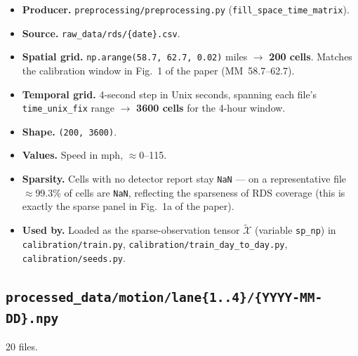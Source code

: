 \documentclass[11pt]{article}
\newcommand{\code}[1]{\texttt{#1}}
\newcommand{\nan}{\code{NaN}}
\newcommand{\filename}[1]{\textcolor{accent}{\code{#1}}}
\begin{document}
\begin{itemize}[leftmargin=*]
  \item \textbf{Producer.} \filename{preprocessing/preprocessing.py} (\code{fill\_space\_time\_matrix}).
  \item \textbf{Source.} \filename{raw\_data/rds/\{date\}.csv}.
  \item \textbf{Spatial grid.} \code{np.arange(58.7, 62.7, 0.02)} miles
    $\to$ \textbf{200 cells}. Matches the calibration window in
    Fig.~1 of the paper (MM~58.7--62.7).
  \item \textbf{Temporal grid.} 4-second step in Unix seconds, spanning each
    file's \code{time\_unix\_fix} range $\to$ \textbf{3600 cells} for the
    4-hour window.
  \item \textbf{Shape.} \code{(200, 3600)}.
  \item \textbf{Values.} Speed in mph, $\approx$0--115.
  \item \textbf{Sparsity.} Cells with no detector report stay \nan{} ---
    on a representative file $\approx$99.3\% of cells are \nan{}, reflecting
    the sparseness of RDS coverage (this is exactly the sparse panel in
    Fig.~1a of the paper).
  \item \textbf{Used by.} Loaded as the sparse-observation tensor
    $\tilde{\mathcal{X}}$ (variable \code{sp\_np}) in
    \code{calibration/train.py},
    \code{calibration/train\_day\_to\_day.py},
    \code{calibration/seeds.py}.
\end{itemize}

\subsection{\filename{processed\_data/motion/lane\{1..4\}/\{YYYY-MM-DD\}.npy}}
\label{sec:processed-motion}

20 files.
\end{document}
